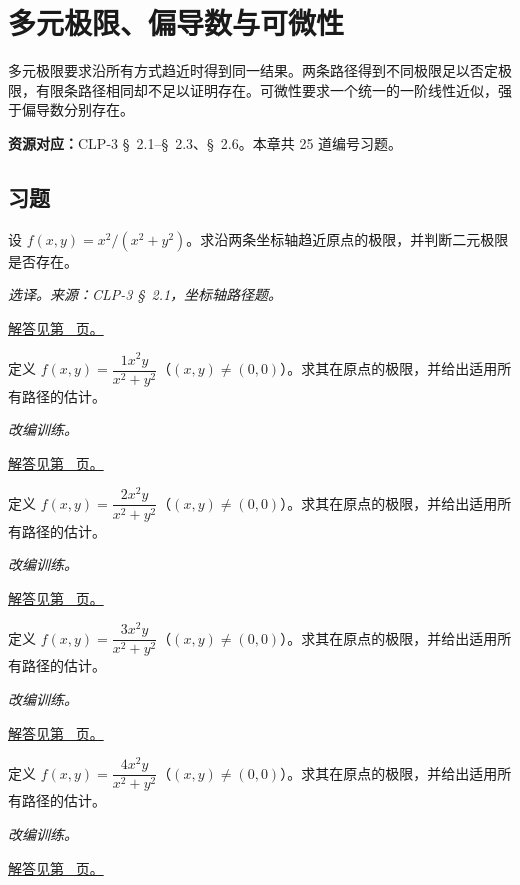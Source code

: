 \documentclass[12pt,fontset=fandol]{ctexart}
\begin{document}
\clearpage
\section{多元极限、偏导数与可微性}\label{sec:ch32}
多元极限要求沿所有方式趋近时得到同一结果。两条路径得到不同极限足以否定极限，有限条路径相同却不足以证明存在。可微性要求一个统一的一阶线性近似，强于偏导数分别存在。

\textbf{资源对应：}CLP-3 \S~2.1--\S~2.3、\S~2.6。本章共 25 道编号习题。
\subsection{习题}
\begin{example}[沿坐标轴检验不存在]\label{ex:c32q1}
设 $f(x,y)=x^2/(x^2+y^2)$。求沿两条坐标轴趋近原点的极限，并判断二元极限是否存在。
\par\textit{选译。来源：CLP-3 \S~2.1，坐标轴路径题。}\par\hyperref[ans:c32q1]{解答见第~\pageref{ans:c32q1} 页。}
\end{example}
\begin{example}[极坐标估计证明极限]\label{ex:c32q2}
定义 $f(x,y)=\dfrac{1x^2y}{x^2+y^2}$（$(x,y)\ne(0,0)$）。求其在原点的极限，并给出适用所有路径的估计。
\par\textit{改编训练。}\par\hyperref[ans:c32q2]{解答见第~\pageref{ans:c32q2} 页。}
\end{example}
\begin{example}[极坐标估计证明极限]\label{ex:c32q3}
定义 $f(x,y)=\dfrac{2x^2y}{x^2+y^2}$（$(x,y)\ne(0,0)$）。求其在原点的极限，并给出适用所有路径的估计。
\par\textit{改编训练。}\par\hyperref[ans:c32q3]{解答见第~\pageref{ans:c32q3} 页。}
\end{example}
\begin{example}[极坐标估计证明极限]\label{ex:c32q4}
定义 $f(x,y)=\dfrac{3x^2y}{x^2+y^2}$（$(x,y)\ne(0,0)$）。求其在原点的极限，并给出适用所有路径的估计。
\par\textit{改编训练。}\par\hyperref[ans:c32q4]{解答见第~\pageref{ans:c32q4} 页。}
\end{example}
\begin{example}[极坐标估计证明极限]\label{ex:c32q5}
定义 $f(x,y)=\dfrac{4x^2y}{x^2+y^2}$（$(x,y)\ne(0,0)$）。求其在原点的极限，并给出适用所有路径的估计。
\par\textit{改编训练。}\par\hyperref[ans:c32q5]{解答见第~\pageref{ans:c32q5} 页。}
\end{example}
\end{document}
